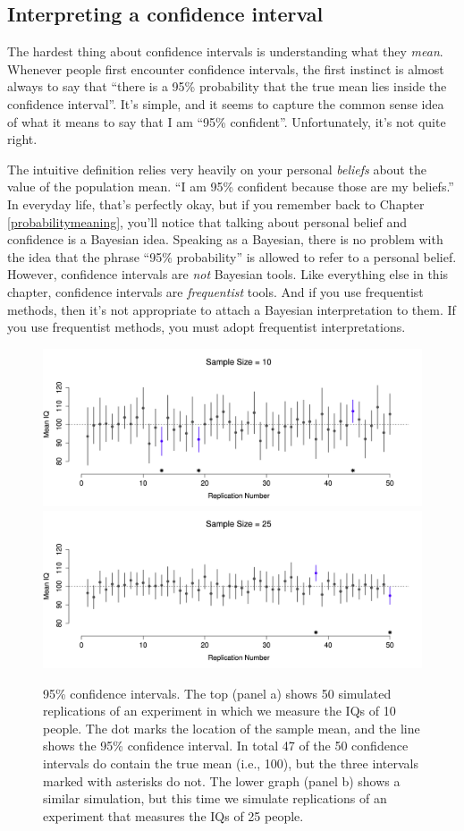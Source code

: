 \documentclass[
  11pt,
  a4paper,
  twoside,symmetric,openright]{book}
\theoremstyle{break}
\theoremstyle{break}
\begin{document}
\subsection{Interpreting a confidence interval}\label{interpreting-a-confidence-interval}

The hardest thing about confidence intervals is understanding what they \emph{mean}. Whenever people first encounter confidence intervals, the first instinct is almost always to say that ``there is a 95\% probability that the true mean lies inside the confidence interval''. It's simple, and it seems to capture the common sense idea of what it means to say that I am ``95\% confident''. Unfortunately, it's not quite right.

The intuitive definition relies very heavily on your personal \emph{beliefs} about the value of the population mean. ``I am 95\% confident because those are my beliefs.'' In everyday life, that's perfectly okay, but if you remember back to Chapter \ref{probabilitymeaning}, you'll notice that talking about personal belief and confidence is a Bayesian idea. Speaking as a Bayesian, there is no problem with the idea that the phrase ``95\% probability'' is allowed to refer to a personal belief. However, confidence intervals are \emph{not} Bayesian tools. Like everything else in this chapter, confidence intervals are \emph{frequentist} tools. And if you use frequentist methods, then it's not appropriate to attach a Bayesian interpretation to them. If you use frequentist methods, you must adopt frequentist interpretations.



\begin{figure}

{\centering \includegraphics[width=0.6\linewidth]{resources/image/confIntReplicatedA} \includegraphics[width=0.6\linewidth]{resources/image/confIntReplicatedB} 

}

\caption{95\% confidence intervals. The top (panel a) shows 50 simulated replications of an experiment in which we measure the IQs of 10 people. The dot marks the location of the sample mean, and the line shows the 95\% confidence interval. In total 47 of the 50 confidence intervals do contain the true mean (i.e., 100), but the three intervals marked with asterisks do not. The lower graph (panel b) shows a similar simulation, but this time we simulate replications of an experiment that measures the IQs of 25 people.}\label{fig:cirep}
\end{figure}
\end{document}
